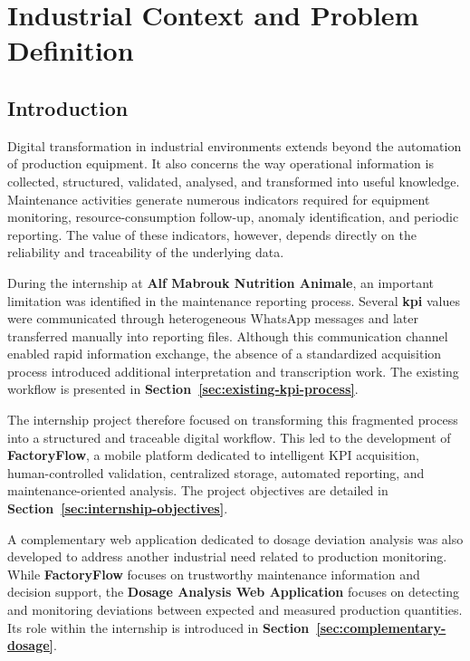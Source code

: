 \chapter{Industrial Context and Problem Definition}
\label{chap:industrial-context}



\section{Introduction}
\label{sec:chapter1-introduction}

Digital transformation in industrial environments extends beyond the automation of production equipment. It also concerns the way operational information is collected, structured, validated, analysed, and transformed into useful knowledge. Maintenance activities generate numerous indicators required for equipment monitoring, resource-consumption follow-up, anomaly identification, and periodic reporting. The value of these indicators, however, depends directly on the reliability and traceability of the underlying data.

During the internship at \textbf{Alf Mabrouk Nutrition Animale}, an important limitation was identified in the maintenance reporting process. Several \textbf{\gls{kpi}} values were communicated through heterogeneous WhatsApp messages and later transferred manually into reporting files. Although this communication channel enabled rapid information exchange, the absence of a standardized acquisition process introduced additional interpretation and transcription work. The existing workflow is presented in \textbf{Section~\ref{sec:existing-kpi-process}}.

The internship project therefore focused on transforming this fragmented process into a structured and traceable digital workflow. This led to the development of \textbf{FactoryFlow}, a mobile platform dedicated to intelligent KPI acquisition, human-controlled validation, centralized storage, automated reporting, and maintenance-oriented analysis. The project objectives are detailed in \textbf{Section~\ref{sec:internship-objectives}}.

A complementary web application dedicated to dosage deviation analysis was also developed to address another industrial need related to production monitoring. While \textbf{FactoryFlow} focuses on trustworthy maintenance information and decision support, the \textbf{Dosage Analysis Web Application} focuses on detecting and monitoring deviations between expected and measured production quantities. Its role within the internship is introduced in \textbf{Section~\ref{sec:complementary-dosage}}.

